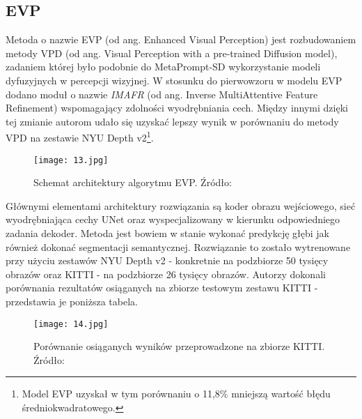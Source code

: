 \subsection{EVP}
Metoda o nazwie EVP \cite{lavreniuk2023} (od ang. Enhanced Visual Perception) jest rozbudowaniem metody VPD \cite{zhao2023} (od ang. Visual Perception with a pre-trained Diffusion model), zadaniem której było podobnie do MetaPrompt-SD wykorzystanie modeli dyfuzyjnych w percepcji wizyjnej. W stosunku do pierwowzoru w modelu EVP dodano moduł o nazwie \textit{IMAFR} (od ang. Inverse MultiAttentive Feature Refinement) wspomagający zdolności wyodrębniania cech. Między innymi dzięki tej zmianie autorom udało się uzyskać lepszy wynik w porównaniu do metody VPD na zestawie NYU Depth v2\footnote{Model EVP uzyskał w tym porównaniu o 11,8\% mniejszą wartość błędu średniokwadratowego.}.
\begin{figure}[H]
    \centering
    \texttt{[image: 13.jpg]}
    \caption{Schemat architektury algorytmu EVP. Źródło: \cite{lavreniuk2023}}
    \label{fig:evp-schema}
\end{figure}
Głównymi elementami architektury rozwiązania są koder obrazu wejściowego, sieć wyodrębniająca cechy UNet oraz wyspecjalizowany w kierunku odpowiedniego zadania dekoder. Metoda jest bowiem w stanie wykonać predykcję głębi jak również dokonać segmentacji semantycznej. Rozwiązanie to zostało wytrenowane przy użyciu zestawów NYU Depth v2 - konkretnie na podzbiorze 50 tysięcy obrazów oraz KITTI - na podzbiorze 26 tysięcy obrazów. Autorzy dokonali porównania rezultatów osiąganych na zbiorze testowym zestawu KITTI - przedstawia je poniższa tabela.
\begin{figure}[H]
    \centering
    \texttt{[image: 14.jpg]}
    \caption{Porównanie osiąganych wyników przeprowadzone na zbiorze KITTI. Źródło: \cite{lavreniuk2023}}
    \label{fig:evp-results}
\end{figure}

